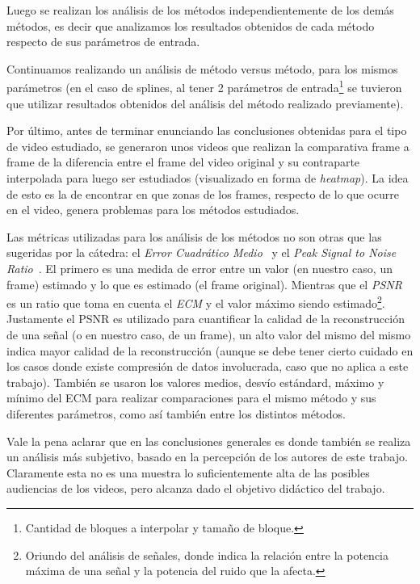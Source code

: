 \par Luego se realizan los an\'alisis de los m\'etodos independientemente de los
dem\'as m\'etodos, es decir que analizamos los resultados obtenidos de cada
m\'etodo respecto de sus par\'ametros de entrada.

\par Continuamos realizando un an\'alisis de m\'etodo versus m\'etodo, para
los mismos par\'ametros (en el caso de splines, al tener 2 par\'ametros de
entrada\footnote{Cantidad de bloques a interpolar y tama\~no de bloque.} se
tuvieron que utilizar resultados obtenidos del an\'alisis del m\'etodo
realizado previamente).

\par Por \'ultimo, antes de terminar enunciando las conclusiones obtenidas para
el tipo de video estudiado, se generaron unos videos que realizan la
comparativa frame a frame de la diferencia entre el frame del video original y
su contraparte interpolada para luego ser estudiados (visualizado en forma de
\emph{heatmap}). La idea de esto es la de encontrar en que zonas de los frames,
respecto de lo que ocurre en el video, genera problemas para los m\'etodos
estudiados.

\par Las m\'etricas utilizadas para los an\'alisis de los m\'etodos no son otras
que las sugeridas por la c\'atedra: el \emph{Error Cuadr\'atico
Medio}~\cite{mse} y el \emph{Peak Signal to Noise Ratio}~\cite{psnr}. El primero
es una medida de error entre un valor (en nuestro caso, un frame) estimado y lo
que es estimado (el frame original). Mientras que el \emph{PSNR} es un ratio
que toma en cuenta el \emph{ECM} y el valor m\'aximo siendo
estimado\footnote{Oriundo del an\'alisis de se\~nales, donde indica la
relaci\'on entre la potencia m\'axima de una se\~nal y la potencia del ruido
que la afecta.}. Justamente el PSNR es utilizado para cuantificar la calidad de
la reconstrucci\'on de una se\~nal (o en nuestro caso, de un frame), un alto
valor del mismo del mismo indica mayor calidad de la reconstrucci\'on (aunque
se debe tener cierto cuidado en los casos donde existe compresi\'on de datos
involucrada, caso que no aplica a este trabajo). Tambi\'en se usaron los
valores medios, desv\'io est\'andard, m\'aximo y m\'inimo del ECM para realizar
comparaciones para el mismo m\'etodo y sus diferentes par\'ametros, como as\'i
tambi\'en entre los distintos m\'etodos.

\par Vale la pena aclarar que en las conclusiones generales es donde tambi\'en
se realiza un an\'alisis m\'as subjetivo, basado en la percepci\'on de los
autores de este trabajo. Claramente esta no es una muestra lo suficientemente
alta de las posibles audiencias de los videos, pero alcanza dado el objetivo
did\'actico del trabajo.

